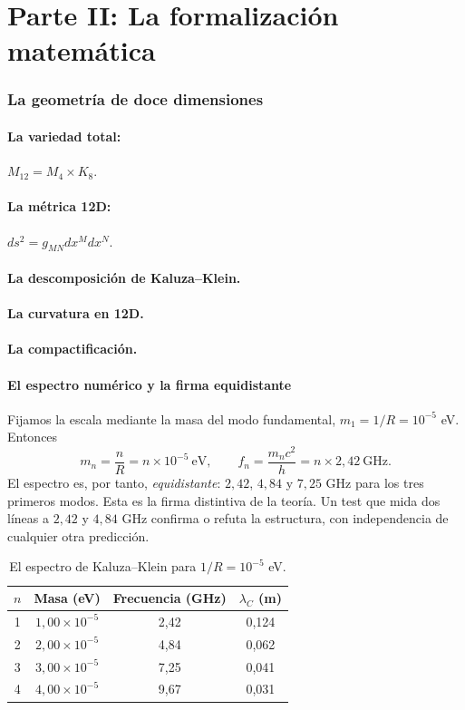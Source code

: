 \part*{Parte II: La formalización matemática}

\section{La geometría de doce dimensiones}
\subsection{La variedad total:} $M_{12} = M_4 \times K_8$.
\subsection{La métrica 12D:} $ds^2 = g_{MN} dx^M dx^N$.
\subsection{La descomposición de Kaluza--Klein.}
\subsection{La curvatura en 12D.}
\subsection{La compactificación.}

\subsection{El espectro numérico y la firma equidistante}
Fijamos la escala mediante la masa del modo fundamental, $m_1 = 1/R = 10^{-5}$ eV. Entonces
\begin{equation}
m_n = \frac{n}{R} = n \times 10^{-5}\ \text{eV},
\qquad
f_n = \frac{m_n c^2}{h} = n \times 2,42\ \text{GHz}.
\end{equation}
El espectro es, por tanto, \emph{equidistante}: $2,42$, $4,84$ y $7,25$ GHz para los tres primeros modos. Esta es la firma distintiva de la teoría. Un test que mida dos líneas a $2,42$ y $4,84$ GHz confirma o refuta la estructura, con independencia de cualquier otra predicción.

\begin{table}[H]
\centering
\begin{tabular}{@{}cccc@{}}
\toprule
$n$ & Masa (eV) & Frecuencia (GHz) & $\lambda_C$ (m) \\ \midrule
1 & $1,00\times10^{-5}$ & 2,42 & 0,124 \\
2 & $2,00\times10^{-5}$ & 4,84 & 0,062 \\
3 & $3,00\times10^{-5}$ & 7,25 & 0,041 \\
4 & $4,00\times10^{-5}$ & 9,67 & 0,031 \\ \bottomrule
\end{tabular}
\caption{El espectro de Kaluza--Klein para $1/R = 10^{-5}$ eV.}
\label{tab:spectru}
\end{table}

